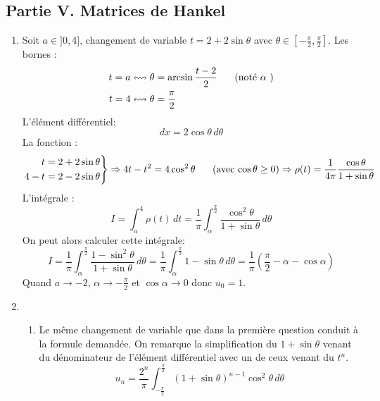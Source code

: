 \subsection*{Partie V. Matrices de Hankel}
\begin{enumerate}
  \item Soit $a\in ]0,4]$, changement de variable $t=2+2\sin \theta$ avec $\theta \in [-\frac{\pi}{2},\frac{\pi}{2}]$.\newline
Les bornes :
\begin{align*}
  t = a &\leftrightsquigarrow \theta = \arcsin\frac{t-2}{2}\hspace{0.5cm}\text{ (noté $\alpha$ )}  \\
  t = 4 &\leftrightsquigarrow \theta = \frac{\pi}{2}
\end{align*}
L'élément différentiel:
\begin{displaymath}
  dx = 2\cos \theta \, d\theta
\end{displaymath}
La fonction :
\begin{displaymath}
\left. 
\begin{aligned}
t&=2+2\sin \theta \\
4-t &= 2-2\sin \theta
\end{aligned}
\right\rbrace
\Rightarrow
4t-t^2 = 4\cos^2 \theta \hspace{0.5cm} \text{ (avec $\cos \theta \geq 0$)}\\
\Rightarrow
\rho(t) = \frac{1}{4\pi} \frac{\cos \theta}{1+\sin \theta}
\end{displaymath}
L'intégrale :
\begin{displaymath}
I = \int_a^4 \rho(t)\,dt
=
\frac{1}{\pi}\int_{\alpha}^{\frac{\pi}{2}}\frac{\cos^2\theta}{1+\sin \theta}\, d\theta
\end{displaymath}
On peut alors calculer cette intégrale:
\begin{displaymath}
  I=\frac{1}{\pi}\int_{\alpha}^{\frac{\pi}{2}}\frac{1-\sin^2\theta}{1+\sin \theta}\, d\theta
= \frac{1}{\pi}\int_{\alpha}^{\frac{\pi}{2}}1-\sin\theta\, d\theta
= \frac{1}{\pi}\left(\frac{\pi}{2} -\alpha - \cos \alpha \right) 
\end{displaymath}
Quand $a\rightarrow -2$, $\alpha \rightarrow -\frac{\pi}{2}$ et $\cos \alpha \rightarrow 0$ donc $u_0 = 1$.

  \item 
\begin{enumerate}
  \item Le même changement de variable que dans la première question conduit à la formule demandée. On remarque la simplification du $1+\sin \theta$ venant du dénominateur de l'élément différentiel avec un de ceux venant du $t^n$.
\begin{displaymath}
  u_n
= \frac{2^n}{\pi}\int_{-\frac{\pi}{2}}^{\frac{\pi}{2}}(1+\sin \theta)^{n-1}\cos^2 \theta \, d\theta
\end{displaymath}


\end{enumerate}
\end{enumerate}
